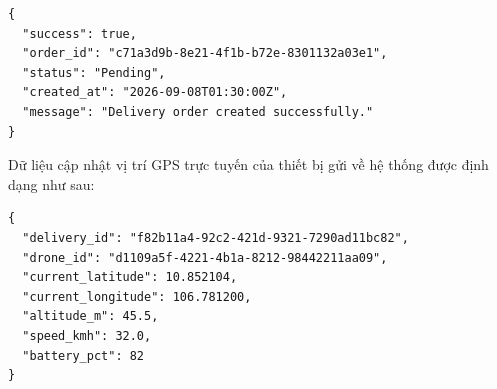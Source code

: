 \begin{verbatim}
{
  "success": true,
  "order_id": "c71a3d9b-8e21-4f1b-b72e-8301132a03e1",
  "status": "Pending",
  "created_at": "2026-09-08T01:30:00Z",
  "message": "Delivery order created successfully."
}
\end{verbatim}

\noindent Dữ liệu cập nhật vị trí GPS trực tuyến của thiết bị gửi về hệ thống được định dạng như sau:

\begin{verbatim}
{
  "delivery_id": "f82b11a4-92c2-421d-9321-7290ad11bc82",
  "drone_id": "d1109a5f-4221-4b1a-8212-98442211aa09",
  "current_latitude": 10.852104,
  "current_longitude": 106.781200,
  "altitude_m": 45.5,
  "speed_kmh": 32.0,
  "battery_pct": 82
}
\end{verbatim}